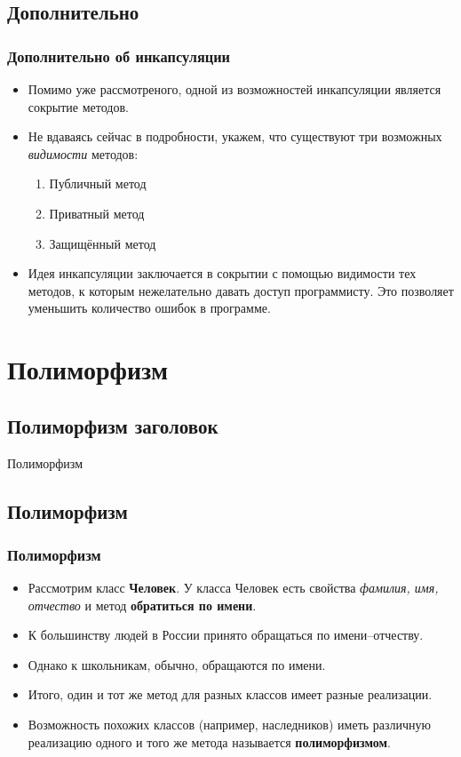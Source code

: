 \documentclass[compress,red]{beamer}
\begin{document}
\subsection{Дополнительно}
\begin{frame}[fragile]
  \frametitle{Дополнительно об инкапсуляции}
  \begin{itemize}
    \item Помимо уже рассмотреного, одной из возможностей инкапсуляции является сокрытие методов.
    \item Не вдаваясь сейчас в подробности, укажем, что существуют три возможных \emph{видимости} методов:
      \begin{enumerate}
        \item Публичный метод
        \item Приватный метод
        \item Защищённый метод
      \end{enumerate}
    \item Идея инкапсуляции заключается в сокрытии с помощью видимости тех методов, к которым нежелательно давать доступ программисту. Это позволяет уменьшить количество ошибок в программе.
  \end{itemize}
\end{frame}

\section{Полиморфизм}

\subsection{Полиморфизм заголовок}
\begin{frame}
  \begin{center}
    \Huge{Полиморфизм}
  \end{center}
\end{frame}

\subsection{Полиморфизм}
\begin{frame}[fragile]
  \frametitle{Полиморфизм}
  \begin{itemize}
    \item Рассмотрим класс \textbf{Человек}. У класса Человек есть свойства \emph{фамилия, имя, отчество} и метод \textbf{обратиться по имени}.
    \item К большинству людей в России принято обращаться по имени--отчеству.
    \item Однако к школьникам, обычно, обращаются по имени.
    \item Итого, один и тот же метод для разных классов имеет разные реализации.
    \item Возможность похожих классов (например, наследников) иметь различную реализацию одного и того же метода называется \textbf{полиморфизмом}.
  \end{itemize}
\end{frame}
\end{document}
